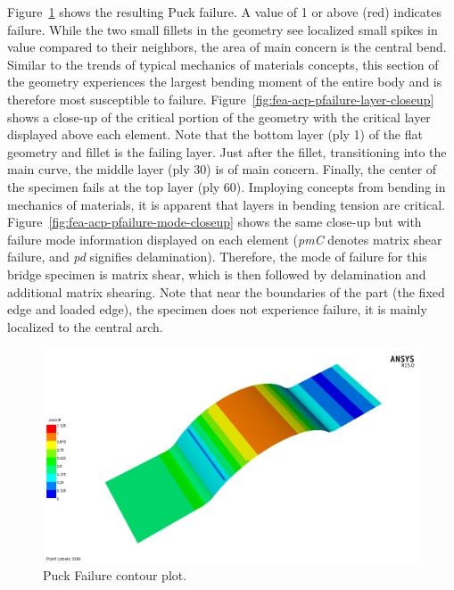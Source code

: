 \clearpage


Figure~\ref{fig:fea-acp-pfailure-notext} shows the resulting Puck failure. A value of 1 or above (red) indicates failure. While the two small fillets in the geometry see localized small spikes in value compared to their neighbors, the area of main concern is the central bend. Similar to the trends of typical mechanics of materials concepts, this section of the geometry experiences the largest bending moment of the entire body and is therefore most susceptible to failure. Figure~\ref{fig:fea-acp-pfailure-layer-closeup} shows a close-up of the critical portion of the geometry with the critical layer displayed above each element. Note that the bottom layer (ply 1) of the flat geometry and fillet is the failing layer. Just after the fillet, transitioning into the main curve, the middle layer (ply 30) is of main concern. Finally, the center of the specimen fails at the top layer (ply 60). Imploying concepts from bending in mechanics of materials, it is apparent that layers in bending tension are critical. Figure~\ref{fig:fea-acp-pfailure-mode-closeup} shows the same close-up but with failure mode information displayed on each element (\emph{pmC} denotes matrix shear failure, and \emph{pd} signifies delamination). Therefore, the mode of failure for this bridge specimen is matrix shear, which is then followed by delamination and additional matrix shearing. Note that near the boundaries of the part (the fixed edge and loaded edge), the specimen does not experience failure, it is mainly localized to the central arch.

\begin{figure}[htp]
\centering
\includegraphics[width=1\textwidth]{./figures/fea/fea-acp-pfailure-notext}
\caption{Puck Failure contour plot.}
\label{fig:fea-acp-pfailure-notext}
\end{figure}

